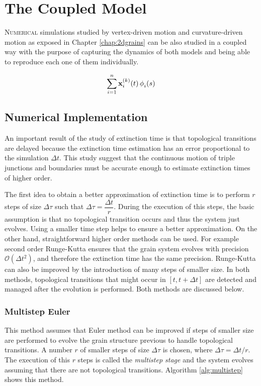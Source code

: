 \chapter{The Coupled Model}
\label{chap:coupledmodel}

\lettrine{N}{umerical} simulations studied by vertex-driven motion and curvature-driven motion as exposed in Chapter \ref{chap:2dgrains} can be also studied in a coupled way with the purpose of capturing the dynamics of both models and being able to reproduce each one of them individually.


\begin{equation}
    \boundary
    \label{eq:boundarydiscret}
\end{equation}

\section{Numerical Implementation}

An important result of the study of extinction time is that topological transitions are delayed because the extinction time estimation has an error proportional to the simulation $\Delta t$. This study suggest that the continuous motion of triple junctions and boundaries must be accurate enough to estimate extinction times of higher order. 

The first idea to obtain a better approximation of extinction time is to perform $r$ steps of size $\Delta \tau$ such that $\Delta \tau = \dfrac{\Delta t}{r}$. During the execution of this steps, the basic assumption is that no topological transition occurs and thus the system just evolves. Using a smaller time step helps to ensure a better approximation. On the other hand, straightforward higher order methods can be used. For example second order Runge-Kutta ensures that the grain system evolves with precision $\mathcal{O}(\Delta t^2)$, and therefore the extinction time has the same precision. Runge-Kutta can also be improved by the introduction of many steps of smaller size. 
In both methods, topological transitions that might occur in $[t, t+\Delta t]$ are detected and managed after the evolution is performed. Both methods are discussed below.

\subsection{Multistep Euler}

This method assumes that Euler method can be improved if steps of smaller size are performed to evolve the grain structure previous to handle topological transitions. A number $r$ of smaller steps of size $\Delta \tau$ is chosen, where $\Delta \tau = \Delta t / r$. The execution of this $r$ steps is called the \emph{multistep stage} and the system evolves assuming that there are not topological transitions. Algorithm \ref{alg:multistep} shows this method.

